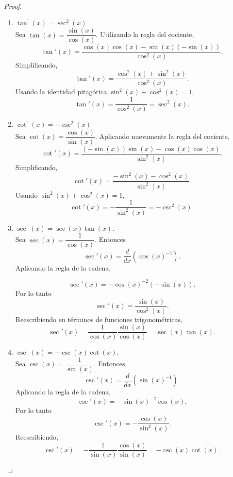 \documentclass[12pt,a4paper]{article}
\begin{document}
    \begin{proof}
        \begin{enumerate}
            \item[(c)] $\tan^{\prime}(x)=\sec^{2}(x)$\\
            Sea $\tan(x)=\dfrac{\sin(x)}{\cos(x)}$. Utilizando la regla del cociente,
            \[
            \tan'(x)
            =
            \frac{\cos(x)\cos(x)-\sin(x)(-\sin(x))}{\cos^2(x)}.
            \]
            Simplificando,
            \[
            \tan'(x)
            =
            \frac{\cos^2(x)+\sin^2(x)}{\cos^2(x)}.
            \]
            Usando la identidad pitagórica $\sin^2(x)+\cos^2(x)=1$,
            \[
            \tan'(x)=\frac{1}{\cos^2(x)}=\sec^2(x).
            \]
            \item[(d)] $\cot^{\prime}(x)=-\csc^{2}(x)$\\
            Sea $\cot(x)=\dfrac{\cos(x)}{\sin(x)}$. Aplicando nuevamente la regla del cociente,
            \[
            \cot'(x)
            =
            \frac{(-\sin(x))\sin(x)-\cos(x)\cos(x)}{\sin^2(x)}.
            \]
            Simplificando,
            \[
            \cot'(x)
            =
            \frac{-\sin^2(x)-\cos^2(x)}{\sin^2(x)}.
            \]
            Usando $\sin^2(x)+\cos^2(x)=1$,
            \[
            \cot'(x)=-\frac{1}{\sin^2(x)}=-\csc^2(x).
            \]
            \item[(e)] $\sec^{\prime}(x)=\sec(x)\tan(x)$.\\
            Sea $\sec(x)=\dfrac{1}{\cos(x)}$. Entonces
            \[
            \sec'(x)
            =
            \frac{d}{dx}\left(\cos(x)^{-1}\right).
            \]
            Aplicando la regla de la cadena,

            \[
            \sec'(x)
            =
            -\cos(x)^{-2}(-\sin(x)).
            \]
            Por lo tanto
            \[
            \sec'(x)=\frac{\sin(x)}{\cos^2(x)}.
            \]
            Reescribiendo en términos de funciones trigonométricas,
            \[
            \sec'(x)
            =
            \frac{1}{\cos(x)}\frac{\sin(x)}{\cos(x)}
            =
            \sec(x)\tan(x).
            \]
            \item[(f)] $\csc^{\prime}(x)=-\csc(x)\cot(x)$.\\
            Sea $\csc(x)=\dfrac{1}{\sin(x)}$. Entonces
            \[
            \csc'(x)
            =
            \frac{d}{dx}\left(\sin(x)^{-1}\right).
            \]
            Aplicando la regla de la cadena,
            \[
            \csc'(x)
            =
            -\sin(x)^{-2}\cos(x).
            \]
            Por lo tanto
            \[
            \csc'(x)
            =
            -\frac{\cos(x)}{\sin^2(x)}.
            \]
            Reescribiendo,
            \[
            \csc'(x)
            =
            -\frac{1}{\sin(x)}\frac{\cos(x)}{\sin(x)}
            =
            -\csc(x)\cot(x).
            \]
        \end{enumerate}
    \end{proof}
\end{document}
